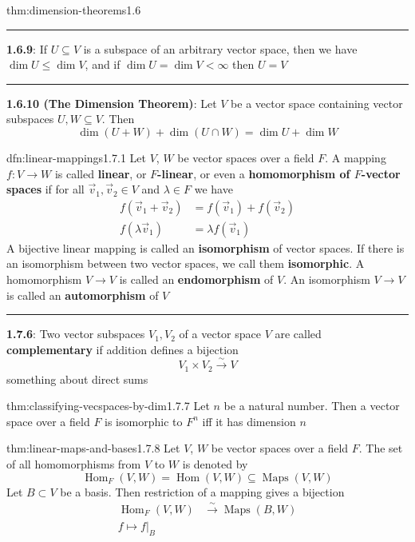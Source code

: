 \documentclass[landscape, 8pt]{extarticle}
\DeclareMathOperator{\Maps}{Maps}
\DeclareMathOperator{\Hom}{Hom}
\begin{document}
\begin{multicols}{3}
\begin{thm}{thm:dimension-theorems}{1.6}
    \noindent\rule{\textwidth}{0.2pt}
    \textbf{1.6.9}: If $U \subseteq V$ is a subspace of an arbitrary vector space, then we have $\dim U \le \dim V$, and if $\dim U = \dim V < \infty$ then $U = V$

    \noindent\rule{\textwidth}{0.2pt}
    \textbf{1.6.10 (The Dimension Theorem)}: Let $V$ be a vector space containing vector subspaces $U,W\subseteq V$. Then
    \[\dim(U + W) + \dim(U \cap W) = \dim U + \dim W\]
\end{thm}

\begin{dfn}{dfn:linear-mappings}{1.7.1}
    Let $V$, $W$ be vector spaces over a field $F$. A mapping $f : V \to W$ is called \textbf{linear}, or \textbf{$F$-linear}, or even a \textbf{homomorphism of $F$-vector spaces} if for all $\vec{v}_{1},\vec{v}_{2}\in V$ and $\lambda \in F$ we have
    \begin{align*}
        f(\vec{v}_{1} + \vec{v}_{2}) &= f(\vec{v}_{1}) + f(\vec{v}_{2})\\
        f(\lambda \vec{v}_{1}) &= \lambda f(\vec{v}_{1})
    \end{align*}
    A bijective linear mapping is called an \textbf{isomorphism} of vector spaces. If there is an isomorphism between two vector spaces, we call them \textbf{isomorphic}. A homomorphism $V\to V$ is called an \textbf{endomorphism} of $V$. An isomorphism $V\to V$ is called an \textbf{automorphism} of $V$

    \noindent\rule{\textwidth}{0.2pt}
    \textbf{1.7.6}: Two vector subspaces $V_{1}, V_{2}$ of a vector space $V$ are called \textbf{complementary} if addition defines a bijection
    \[V_{1} \times V_{2} \xrightarrow{\sim} V\]
    something about direct sums
\end{dfn}

\vspace{-5pt}
\begin{thm}{thm:classifying-vecspaces-by-dim}{1.7.7}
    Let $n$ be a natural number. Then a vector space over a field $F$ is isomorphic to $F^{n}$ iff it has dimension $n$
\end{thm}

\vspace{-5pt}
\begin{thm}{thm:linear-maps-and-bases}{1.7.8}
    Let $V$, $W$ be vector spaces over a field $F$. The set of all homomorphisms from $V$ to $W$ is denoted by
    \[\Hom_{F}(V,W) = \Hom(V,W)\subseteq \Maps(V,W)\]
    Let $B \subset V$ be a basis. Then restriction of a mapping gives a bijection
    \begin{align*}
        \Hom_{F}(V, W) &\xrightarrow{\sim} \Maps(B, W) \\
        f \mapsto f \lvert_{B}
    \end{align*}
\end{thm}


\end{multicols}
\end{document}

